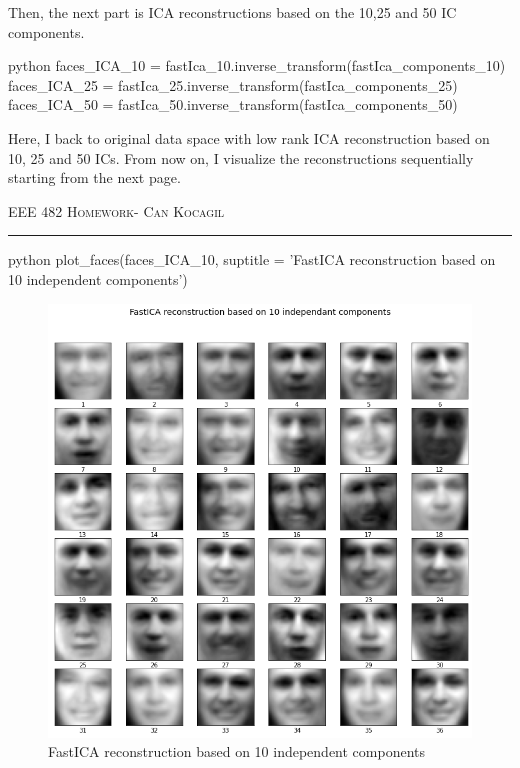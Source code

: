 \documentclass[12pt]{amsart}
\begin{document}
Then, the next part is ICA reconstructions based on the 10,25 and 50 IC components. 

\begin{mintedbox}{python}
faces_ICA_10 = fastIca_10.inverse_transform(fastIca_components_10)
faces_ICA_25 = fastIca_25.inverse_transform(fastIca_components_25)
faces_ICA_50 = fastIca_50.inverse_transform(fastIca_components_50)
\end{mintedbox}

Here, I back to original data space with low rank ICA reconstruction based on 10, 25 and 50 ICs. From now on, I visualize the reconstructions sequentially starting from the next page.


\newpage
{\scshape EEE 482} \hfill {\scshape \large  Homework-\relax} \hfill {\scshape Can Kocagil}
\smallskip
\hrule
\vspace{2mm}

\begin{mintedbox}{python}
plot_faces(faces_ICA_10, suptitle = 'FastICA reconstruction based on 10 independent components')
\end{mintedbox}

\begin{figure}[h]
    \centering
        \includegraphics[width = 1\textwidth]{images/Q1/FastICA reconstruction based on 10 independant component.png}
        \caption{FastICA reconstruction based on 10 independent components}
\end{figure}
\end{document}
